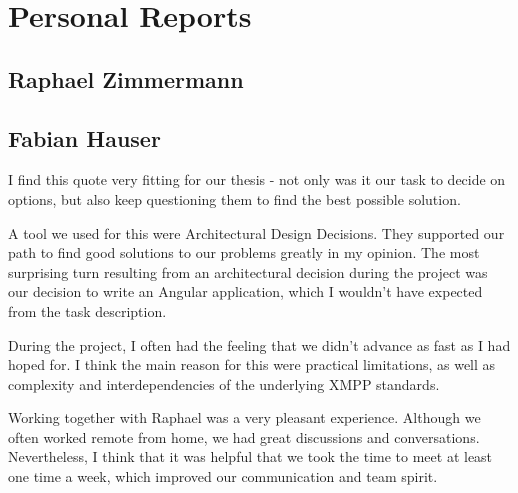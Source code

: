 \section{Personal Reports}\label{sec:personal-reports}

\subsection{Raphael Zimmermann}

\subsection{Fabian Hauser}

%
I find this quote very fitting for our thesis - not only was it our task to decide on options,
but also keep questioning them to find the best possible solution.

A tool we used for this were Architectural Design Decisions.
They supported our path to find good solutions to our problems greatly in my opinion.
The most surprising turn resulting from an architectural decision during the project was our decision to write an Angular application,
which I wouldn't have expected from the task description.

During the project, I often had the feeling that we didn't advance as fast as I had hoped for.
I think the main reason for this were practical limitations, as well as complexity and interdependencies of the underlying XMPP standards.

Working together with Raphael was a very pleasant experience.
Although we often worked remote from home, we had great discussions and conversations.
Nevertheless, I think that it was helpful that we took the time to meet at least one time a week, which improved our communication and team spirit.